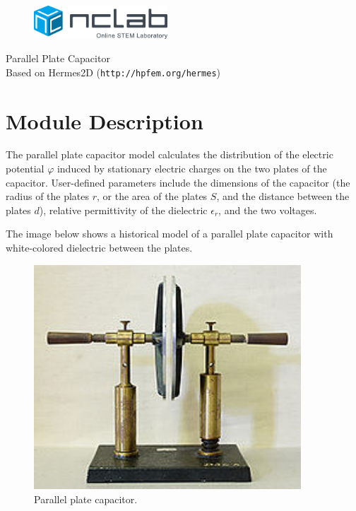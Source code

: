 \documentclass{article}
\begin{document}
\large

\vbox{}
\vspace{-2cm}
\begin{figure}[!ht]
\includegraphics[width=5cm]{img/logo.png}
\vspace{4mm}
\end{figure}
\noindent
\begin{center}
{\Huge Parallel Plate Capacitor}\\[2mm]
Based on Hermes2D ({\tt http://hpfem.org/hermes})\\[6mm]
\end{center}
\section{Module Description}

The parallel plate capacitor model calculates the distribution of the electric 
potential $\varphi$ induced by stationary electric charges on the two plates of the capacitor.
User-defined parameters include the dimensions of the capacitor (the radius of the plates $r$, or the area of the plates $S$, 
and the distance between the plates $d$), relative permittivity of the dielectric $\epsilon_r$, 
and the two voltages.

The image below shows a historical model of a parallel plate capacitor with white-colored 
dielectric between the plates.
 

\begin{figure}[!ht]
\begin{center}
\includegraphics[width=10cm]{img/capacitor.png}
\caption{Parallel plate capacitor.}
\vspace{4mm}
\end{center}
\end{figure}
\noindent
\end{document}
